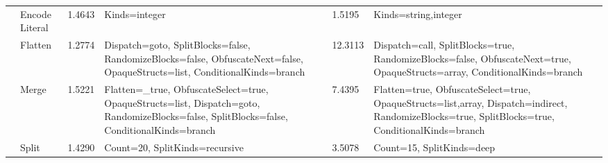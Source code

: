 \begin{table*}[p]
\begin{footnotesize}
\begin{tabular}{|p{1.5cm}|l|l|p{5cm}|l|p{5cm}|}
                                                                               & Encode Literal                                                         & 1.4643                                                    &  Kinds=integer                                                                                                                                                                           & 1.5195                                                    &  Kinds=string,integer                                                                                                                                                                        \\ \cline{2-6} 
                                                                               & Flatten                                                                & 1.2774                                                    &  Dispatch=goto, SplitBlocks=false, RandomizeBlocks=false, ObfuscateNext=false, OpaqueStructs=list, ConditionalKinds=branch                                                               & 12.3113                                                   &  Dispatch=call, SplitBlocks=true, RandomizeBlocks=false, ObfuscateNext=true, OpaqueStructs=array, ConditionalKinds=branch                                                                    \\ \cline{2-6} 
                                                                               & Merge                                                                  & 1.5221                                                    &  Flatten=\_true, ObfuscateSelect=true, OpaqueStructs=list, Dispatch=goto, RandomizeBlocks=false, SplitBlocks=false, ConditionalKinds=branch                                              & 7.4395                                                    &  Flatten=true, ObfuscateSelect=true, OpaqueStructs=list,array, Dispatch=indirect, RandomizeBlocks=true, SplitBlocks=true, ConditionalKinds=branch                                            \\ \cline{2-6} 
                                                                               & Split                                                                  & 1.4290                                                    &  Count=20, SplitKinds=recursive                                                                                                                                                          & 3.5078                                                    &  Count=15, SplitKinds=deep                                                                                                                                                                   \\ \cline{2-6} 

\end{tabular}
\end{footnotesize}
\end{table*}
